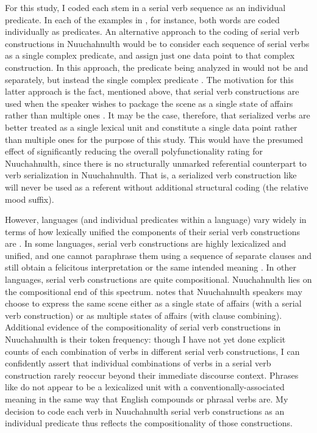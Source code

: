 For this study, I coded each stem in a serial verb sequence as an individual predicate. In each of the examples in , for instance, both words are coded individually as predicates. An alternative approach to the coding of serial verb constructions in Nuuchahnulth would be to consider each sequence of serial verbs as a single complex predicate, and assign just one data point to that complex construction. In this approach, the predicate being analyzed in  would not be   and   separately, but instead the single complex predicate  . The motivation for this latter approach is the fact, mentioned above, that serial verb constructions are used when the speaker wishes to package the scene as a single state of affairs rather than multiple ones \parencite[98--99]{Nakayama2001}. It may be the case, therefore, that serialized verbs are better treated as a single lexical unit and constitute a single data point rather than multiple ones for the purpose of this study. This would have the presumed effect of significantly reducing the overall polyfunctionality rating for Nuuchahnulth, since there is no structurally unmarked referential counterpart to verb serialization in Nuuchahnulth. That is, a serialized verb construction like  will never be used as a referent without additional structural coding (the relative mood suffix).

However, languages (and individual predicates within a language) vary widely in terms of how lexically unified the components of their serial verb constructions are \parencite[11--12]{Aikhenvald2006}. In some languages, serial verb constructions are highly lexicalized and unified, and one cannot paraphrase them using a sequence of separate clauses and still obtain a felicitous interpretation or the same intended meaning \parencite[6, 11--12]{Aikhenvald2006}. In other languages, serial verb constructions are quite compositional. Nuuchahnulth lies on the compositional end of this spectrum. \textcite[98]{Nakayama2001} notes that Nuuchahnulth speakers may choose to express the same scene either as a single state of affairs (with a serial verb construction) or as multiple states of affairs (with clause combining). Additional evidence of the compositionality of serial verb constructions in Nuuchahnulth is their token frequency: though I have not yet done explicit counts of each combination of verbs in different serial verb constructions, I can confidently assert that individual combinations of verbs in a serial verb construction rarely reoccur beyond their immediate discourse context. Phrases like   do not appear to be a lexicalized unit with a conventionally-associated meaning in the same way that English compounds or phrasal verbs are. My decision to code each verb in Nuuchahnulth serial verb constructions as an individual predicate thus reflects the compositionality of those constructions.

